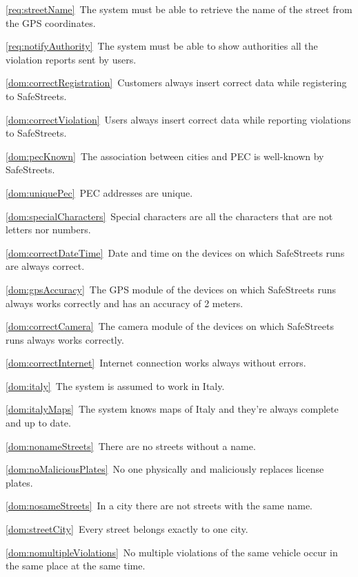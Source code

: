 \begin{description}
\begin{description}
					\item \ref{req:streetName}\ The system must be able to retrieve the name of the street from the GPS coordinates.
					\item \ref{req:notifyAuthority}\ The system must be able to show authorities all the violation reports sent by users.
					\item \ref{dom:correctRegistration}\ Customers always insert correct data while registering to SafeStreets.
					\item \ref{dom:correctViolation}\ Users always insert correct data while reporting violations to SafeStreets.
					\item \ref{dom:pecKnown}\ The association between cities and PEC is well-known by SafeStreets.
					\item \ref{dom:uniquePec}\ PEC addresses are unique.
					\item \ref{dom:specialCharacters}\ Special characters are all the characters that are not letters nor numbers.
					\item \ref{dom:correctDateTime}\ Date and time on the devices on which SafeStreets runs are always correct.
					\item \ref{dom:gpsAccuracy}\ The GPS module of the devices on which SafeStreets runs always works correctly and has an accuracy of 2 meters.
					\item \ref{dom:correctCamera}\ The camera module of the devices on which SafeStreets runs always works correctly.
					\item \ref{dom:correctInternet}\ Internet connection works always without errors.
					\item \ref{dom:italy}\ The system is assumed to work in Italy.
					\item \ref{dom:italyMaps}\ The system knows maps of Italy and they’re always complete and up to date.
					\item \ref{dom:nonameStreets}\ There are no streets without a name.
					\item \ref{dom:noMaliciousPlates}\ No one physically and maliciously replaces license plates.
					\item \ref{dom:nosameStreets}\ In a city there are not streets with the same name.
					\item \ref{dom:streetCity}\ Every street belongs exactly to one city.
					\item \ref{dom:nomultipleViolations}\ No multiple violations of the same vehicle occur in the same place at the same time.
				\end{description}
					

\end{description}
